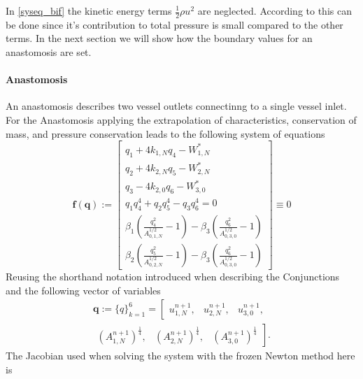 \documentclass[a4paper, oneside]{discothesis}
\begin{document}
							In \ref{syseq_bif} the kinetic energy terms $\frac{1}{2} \rho u^2$ are neglected.
							According to \cite{Formaggia2003OnedimensionalMF} this can be done since it's contribution to total pressure is small compared to the other terms.
							In the next section we will show how the boundary values for an anastomosis are set.

							\paragraph{Anastomosis} \label{par:anastomosis}
							An anastomosis describes two vessel outlets connectinng to a single vessel inlet.
							For the Anastomosis applying the extrapolation of characteristics, conservation of mass, and pressure conservation leads to the following system of equations
							\begin{equation}
								\mathbf{f}(\mathbf{q}):=\left[\begin{array}{c}
										q_{1}+4 k_{1,N} q_{4}-W_{1,N}^* \\
										q_{2}+4 k_{2,N} q_{5}-W_{2,N}^* \\
										q_{3}-4 k_{2,0} q_{6}-W_{3,0}^* \\
										q_{1} q_{4}^4+q_{2} q_{5}^4-q_{3} q_{6}^4=0 \\
										\beta_1\left(\frac{q_{4}^2}{A_{0,1,N}^{1 / 2}}-1\right)-\beta_3\left(\frac{q_{6}^2}{A_{0,3,0}^{1 / 2}}-1\right) \\
										\beta_2\left(\frac{q_{5}^2}{A_{0,2,N}^{1 / 2}}-1\right)-\beta_3\left(\frac{q_{6}^2}{A_{0,3,0}^{1 / 2}}-1\right)
								\end{array}\right] \equiv 0
							\end{equation}
							Reusing the shorthand notation introduced when describing the Conjunctions and the following vector of variables
							\begin{multline}
								\mathbf{q}:=\{q\}_{k=1}^6=\left[
									\begin{array}{lll}
										u_{1,N}^{n+1}, & u_{2,N}^{n+1}, & u_{3,0}^{n+1}, 
								\end{array} \right. \\
								\left. \begin{array}{lll}
										\left(A_{1,N}^{n+1}\right)^{\frac{1}{4}}, & \left(A_{2,N}^{n+1}\right)^{\frac{1}{4}}, & \left(A_{3,0}^{n+1}\right)^{\frac{1}{4}}
								\end{array} \right].
							\end{multline}
							The Jacobian used when solving the system with the frozen Newton method here is
\end{document}
